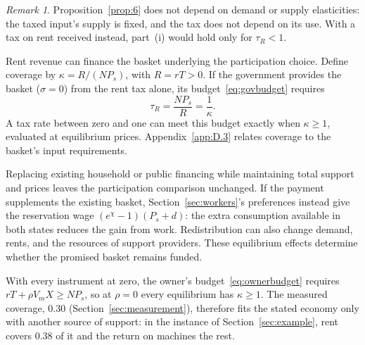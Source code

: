 \documentclass[12pt]{article}
\theoremstyle{plain}
\theoremstyle{definition}
\theoremstyle{remark}
\newtheorem*{remark}{Remark}
\begin{document}
\begin{remark}
Proposition~\ref{prop:6} does not depend on demand or supply elasticities: the taxed input's supply is fixed, and the tax does not depend on its use. With a tax on rent received instead, part~(i) would hold only for $\tau_R<1$.
\end{remark}

Rent revenue can finance the basket underlying the participation choice. Define coverage by $\kappa=R/(NP_s)$, with $R=rT>0$. If the government provides the basket ($\sigma=0$) from the rent tax alone, its budget~\eqref{eq:govbudget} requires
\begin{equation}\label{eq:16}
\tau_R=\frac{NP_s}{R}=\frac{1}{\kappa}.
\end{equation}
A tax rate between zero and one can meet this budget exactly when $\kappa\ge1$, evaluated at equilibrium prices. Appendix~\ref{app:D.3} relates coverage to the basket's input requirements.

Replacing existing household or public financing while maintaining total support and prices leaves the participation comparison unchanged. If the payment supplements the existing basket, Section~\ref{sec:workers}'s preferences instead give the reservation wage $(e^\chi-1)(P_s+d)$: the extra consumption available in both states reduces the gain from work. Redistribution can also change demand, rents, and the resources of support providers. These equilibrium effects determine whether the promised basket remains funded.

With every instrument at zero, the owner's budget~\eqref{eq:ownerbudget} requires $rT+\rho V_mX\ge NP_s$, so at $\rho=0$ every equilibrium has $\kappa\ge1$. The measured coverage, $0.30$ (Section~\ref{sec:measurement}), therefore fits the stated economy only with another source of support: in the instance of Section~\ref{sec:example}, rent covers $0.38$ of it and the return on machines the rest.
\end{document}

